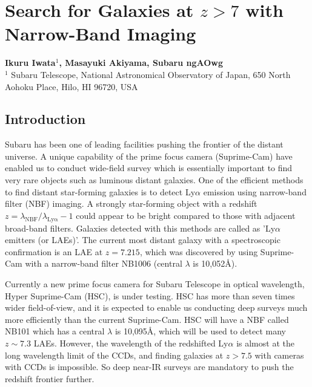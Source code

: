 \def\thisdir{science/veryhighz/}


\section{Search for Galaxies at $z>7$ with Narrow-Band Imaging
\label{sec:nbf}}

\noindent
\begin{center}
{\bf Ikuru Iwata$^{1}$, Masayuki Akiyama, Subaru ngAOwg}\\
$^1$ Subaru Telescope, National Astronomical Observatory of Japan, 650
North Aohoku Place, Hilo, HI 96720, USA
\end{center}
\vspace{0.5cm}

\subsection{Introduction}

Subaru has been one of leading facilities pushing the frontier of
the distant universe. A unique capability of the prime focus camera
(Suprime-Cam) have enabled us to conduct wide-field survey which is
essentially important to find very rare objects such as luminous distant
galaxies. One of the efficient methods to find distant star-forming
galaxies is to detect Ly$\alpha$ emission using narrow-band filter (NBF) 
imaging. A strongly star-forming object with a redshift 
$z = \lambda_\mathrm{NBF} / \lambda_\mathrm{Ly\alpha} -1$ could
appear to be bright compared to those with adjacent broad-band
filters. Galaxies detected with this methods are called as 'Ly$\alpha$
emitters (or LAEs)'. The current most distant galaxy with a spectroscopic 
confirmation is an LAE at $z=7.215$, which was discovered by
\citet{Shibuya2012} using Suprime-Cam with a narrow-band filter NB1006
(central $\lambda$ is 10,052\AA).

Currently a new prime focus camera for Subaru Telescope in optical
wavelength, Hyper Suprime-Cam (HSC), is under testing. HSC has more than
seven times wider field-of-view, and it is expected to enable us
conducting deep surveys much more efficiently than the current
Suprime-Cam. HSC will have a NBF called NB101 which has a central
$\lambda$ is 10,095\AA, which will be used to detect many $z\sim 7.3$
LAEs. 
However, the wavelength of the redshifted Ly$\alpha$ is almost at the
long wavelength limit of the CCDs, and finding galaxies at $z>7.5$ with
cameras with CCDs is impossible. So deep near-IR surveys are mandatory
to push the redshift frontier further.

